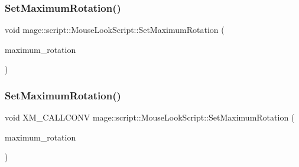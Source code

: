 \hypertarget{classmage_1_1script_1_1_mouse_look_script_a878f1268e16f0af89d177fd026b18253}{}\label{classmage_1_1script_1_1_mouse_look_script_a878f1268e16f0af89d177fd026b18253} 
\subsubsection{\texorpdfstring{Set\+Maximum\+Rotation()}{SetMaximumRotation()}\hspace{0.1cm}{\footnotesize\ttfamily [2/3]}}
{\footnotesize\ttfamily void mage\+::script\+::\+Mouse\+Look\+Script\+::\+Set\+Maximum\+Rotation (\begin{DoxyParamCaption}\item[{\hyperlink{namespacemage_aa87237ad091f5cd7da612b8523fc108f}{F32x2}}]{maximum\+\_\+rotation }\end{DoxyParamCaption})\hspace{0.3cm}{\ttfamily [noexcept]}}

\hypertarget{classmage_1_1script_1_1_mouse_look_script_a263e143e671ef56c04132b5e58d114a9}{}\label{classmage_1_1script_1_1_mouse_look_script_a263e143e671ef56c04132b5e58d114a9} 
\subsubsection{\texorpdfstring{Set\+Maximum\+Rotation()}{SetMaximumRotation()}\hspace{0.1cm}{\footnotesize\ttfamily [3/3]}}
{\footnotesize\ttfamily void X\+M\+\_\+\+C\+A\+L\+L\+C\+O\+NV mage\+::script\+::\+Mouse\+Look\+Script\+::\+Set\+Maximum\+Rotation (\begin{DoxyParamCaption}\item[{F\+X\+M\+V\+E\+C\+T\+OR}]{maximum\+\_\+rotation }\end{DoxyParamCaption})\hspace{0.3cm}{\ttfamily [noexcept]}}

\hypertarget{classmage_1_1script_1_1_mouse_look_script_a538d1d81ac4220a0e20e3e5de5c8e3a6}{}\label{classmage_1_1script_1_1_mouse_look_script_a538d1d81ac4220a0e20e3e5de5c8e3a6} 
